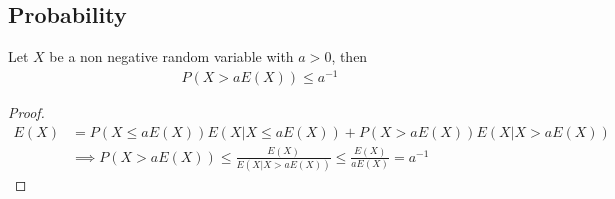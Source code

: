 \documentclass{math}
\begin{document}
\subsection{Probability}

\begin{theorem}\label{thm:markov}
    Let $X$ be a non negative random variable with $a > 0$, then
    \begin{align*}
        P(X > a E(X)) \leq a^{-1}
    \end{align*}
\end{theorem}
\begin{proof}
    \begin{align*}
        E(X) & = P(X \leq a E(X)) E(X | X \leq a E(X)) + P(X > a E(X)) E(X | X > a E(X))                  \\
             & \implies P(X > a E(X)) \leq \frac{E(X)}{E(X | X > aE(X))} \leq \frac{E(X)}{aE(X)} = a^{-1}
    \end{align*}
\end{proof}
\end{document}
